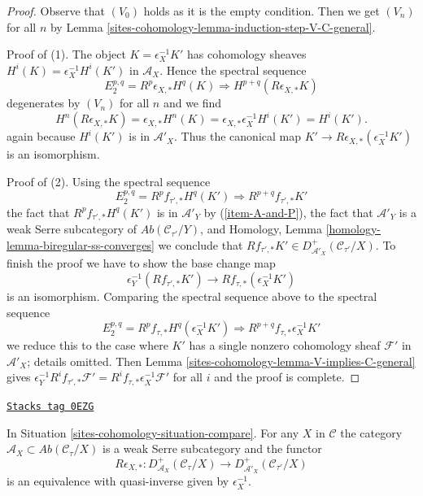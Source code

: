 \begin{proof}
Observe that $(V_0)$ holds as it is the empty condition.
Then we get $(V_n)$ for all $n$ by
Lemma \ref{sites-cohomology-lemma-induction-step-V-C-general}.

\medskip\noindent
Proof of (1). The object $K = \epsilon_X^{-1}K'$ has cohomology
sheaves $H^i(K) = \epsilon_X^{-1}H^i(K')$ in $\mathcal{A}_X$.
Hence the spectral sequence
$$
E_2^{p, q} = R^p\epsilon_{X, *} H^q(K) \Rightarrow
H^{p + q}(R\epsilon_{X, *}K)
$$
degenerates by $(V_n)$ for all $n$ and we find
$$
H^n(R\epsilon_{X, *}K) = \epsilon_{X, *}H^n(K) =
\epsilon_{X, *}\epsilon_X^{-1}H^i(K') = H^i(K').
$$
again because $H^i(K')$ is in $\mathcal{A}'_X$.
Thus the canonical map $K' \to R\epsilon_{X, *}(\epsilon_X^{-1}K')$
is an isomorphism.

\medskip\noindent
Proof of (2). Using the spectral sequence
$$
E_2^{p, q} = R^pf_{\tau', *}H^q(K') \Rightarrow R^{p + q}f_{\tau', *}K'
$$
the fact that $R^pf_{\tau', *}H^q(K')$ is in
$\mathcal{A}'_Y$ by (\ref{item-A-and-P}),
the fact that $\mathcal{A}'_Y$ is a weak Serre subcategory of
$\textit{Ab}(\mathcal{C}_{\tau'}/Y)$,
and Homology, Lemma \ref{homology-lemma-biregular-ss-converges}
we conclude that
$Rf_{\tau', *}K' \in D^+_{\mathcal{A}'_X}(\mathcal{C}_{\tau'}/X)$.
To finish the proof we have to show the base change map
$$
\epsilon_Y^{-1}(Rf_{\tau', *}K')
\longrightarrow
Rf_{\tau, *}(\epsilon_X^{-1}K')
$$
is an isomorphism. Comparing the spectral sequence above to the
spectral sequence
$$
E_2^{p, q} = R^pf_{\tau, *}H^q(\epsilon_X^{-1}K')
\Rightarrow R^{p + q}f_{\tau, *}\epsilon_X^{-1}K'
$$
we reduce this to the case where $K'$ has a single nonzero
cohomology sheaf $\mathcal{F}'$ in $\mathcal{A}'_X$; details omitted.
Then Lemma \ref{sites-cohomology-lemma-V-implies-C-general} gives
$\epsilon_Y^{-1}R^if_{\tau', *}\mathcal{F}' =
R^if_{\tau, *}\epsilon_X^{-1}\mathcal{F}'$ for all $i$
and the proof is complete.
\end{proof}

\begin{lemma}
\label{sites-cohomology-lemma-cohomological-descent-general}
\href{https://stacks.math.columbia.edu/tag/0EZG}{\texttt{Stacks tag 0EZG}}

In Situation \ref{sites-cohomology-situation-compare}. For any $X$ in
$\mathcal{C}$ the category
$\mathcal{A}_X \subset \textit{Ab}(\mathcal{C}_\tau/X)$
is a weak Serre subcategory and the functor
$$
R\epsilon_{X, *} :
D^+_{\mathcal{A}_X}(\mathcal{C}_\tau/X)
\longrightarrow
D^+_{\mathcal{A}'_X}(\mathcal{C}_{\tau'}/X)
$$
is an equivalence with quasi-inverse given by $\epsilon_X^{-1}$.
\end{lemma}

